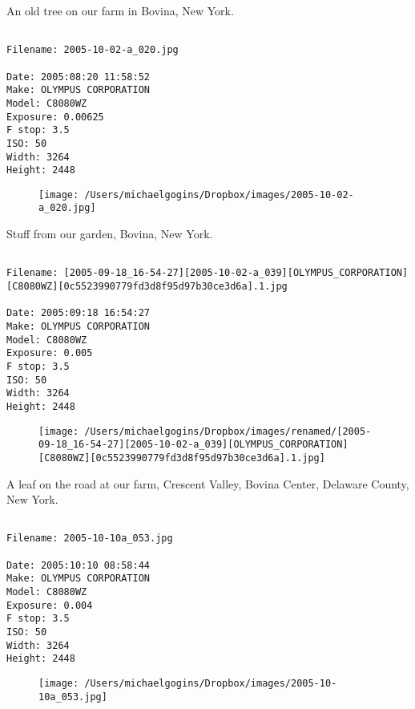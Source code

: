 \documentclass[11pt,letter,DIV=14,paper=landscape]{scrbook}
\begin{document}
\clearpage
\noindent An old tree on our farm in Bovina, New York.
\noindent
\begin{lstlisting}

Filename: 2005-10-02-a_020.jpg

Date: 2005:08:20 11:58:52
Make: OLYMPUS CORPORATION
Model: C8080WZ
Exposure: 0.00625
F stop: 3.5
ISO: 50
Width: 3264
Height: 2448
\end{lstlisting}
\clearpage

\begin{figure}
\texttt{[image: /Users/michaelgogins/Dropbox/images/2005-10-02-a\_020.jpg]}
\end{figure}
    
\clearpage
\noindent Stuff from our garden, Bovina, New York.
\noindent
\begin{lstlisting}

Filename: [2005-09-18_16-54-27][2005-10-02-a_039][OLYMPUS_CORPORATION][C8080WZ][0c5523990779fd3d8f95d97b30ce3d6a].1.jpg

Date: 2005:09:18 16:54:27
Make: OLYMPUS CORPORATION
Model: C8080WZ
Exposure: 0.005
F stop: 3.5
ISO: 50
Width: 3264
Height: 2448
\end{lstlisting}
\clearpage

\begin{figure}
\texttt{[image: /Users/michaelgogins/Dropbox/images/renamed/[2005-09-18\_16-54-27][2005-10-02-a\_039][OLYMPUS\_CORPORATION][C8080WZ][0c5523990779fd3d8f95d97b30ce3d6a].1.jpg]}
\end{figure}
    
\clearpage
\noindent A leaf on the road at our farm, Crescent Valley, Bovina Center, Delaware County, New York.
\noindent
\begin{lstlisting}

Filename: 2005-10-10a_053.jpg

Date: 2005:10:10 08:58:44
Make: OLYMPUS CORPORATION
Model: C8080WZ
Exposure: 0.004
F stop: 3.5
ISO: 50
Width: 3264
Height: 2448
\end{lstlisting}
\clearpage

\begin{figure}
\texttt{[image: /Users/michaelgogins/Dropbox/images/2005-10-10a\_053.jpg]}
\end{figure}
    
\end{document}
